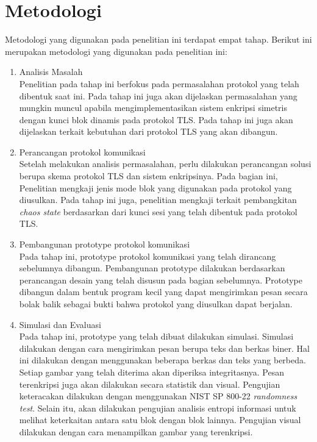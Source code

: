 \section{Metodologi}
Metodologi yang digunakan pada penelitian ini terdapat empat tahap. Berikut ini merupakan metodologi yang digunakan pada penelitian ini:
\begin{enumerate}
  \item Analisis Masalah\\
  Penelitian pada tahap ini berfokus pada permasalahan protokol yang telah dibentuk saat ini. Pada tahap ini juga akan dijelaskan permasalahan yang mungkin muncul apabila mengimplementasikan sistem enkripsi simetris dengan kunci blok dinamis pada protokol TLS. Pada tahap ini juga akan dijelaskan terkait kebutuhan dari protokol TLS yang akan dibangun.

  \item Perancangan protokol komunikasi\\
  Setelah melakukan analisis permasalahan, perlu dilakukan perancangan solusi berupa skema protokol TLS dan sistem enkripsinya. Pada bagian ini, Penelitian mengkaji jenis mode blok yang digunakan pada protokol yang diusulkan. Pada tahap ini juga, penelitian mengkaji terkait pembangkitan \emph{chaos state} berdasarkan dari kunci sesi yang telah dibentuk pada protokol TLS.

  \item Pembangunan prototype protokol komunikasi\\
  Pada tahap ini, prototype protokol komunikasi yang telah dirancang sebelumnya dibangun. Pembangunan prototype dilakukan berdasarkan perancangan desain yang telah disusun pada bagian sebelumnya. Prototype dibangun dalam bentuk program kecil yang dapat mengirimkan pesan secara bolak balik sebagai bukti bahwa protokol yang diusulkan dapat berjalan.

  \item Simulasi dan Evaluasi\\
  Pada tahap ini, prototype yang telah dibuat dilakukan simulasi. Simulasi dilakukan dengan cara mengirimkan pesan berupa teks dan berkas biner. Hal ini dilakukan dengan menggunakan beberapa berkas dan teks yang berbeda. Setiap gambar yang telah diterima akan diperiksa integritasnya. Pesan terenkripsi juga akan dilakukan secara statistik dan visual. Pengujian keteracakan dilakukan dengan menggunakan NIST SP 800-22 \emph{randomness test}. Selain itu, akan dilakukan pengujian analisis entropi informasi untuk melihat keterkaitan antara satu blok dengan blok lainnya. Pengujian visual dilakukan dengan cara menampilkan gambar yang terenkripsi.
\end{enumerate}

